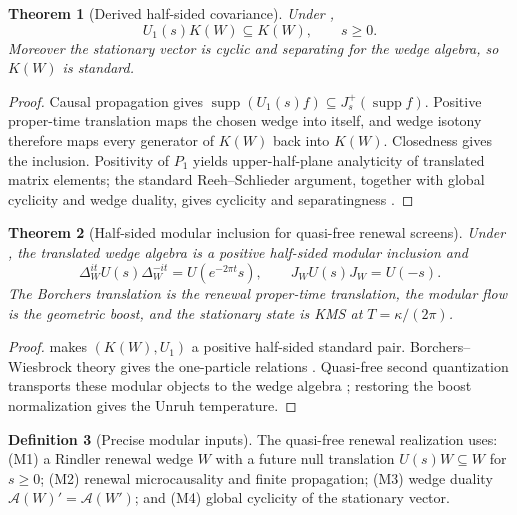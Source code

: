 \documentclass[11pt]{article}
\newtheorem{theorem}{Theorem}[section]
\theoremstyle{definition}
\newtheorem{definition}[theorem]{Definition}
\theoremstyle{remark}
\newcommand{\A}{\mathcal A}
\DeclareMathOperator{\supp}{supp}
\begin{document}
\begin{theorem}[Derived half-sided covariance]
\label{thm:derived-half-sided}
Under ,
\[
 U_1(s)K(W)\subseteq K(W),\qquad s\ge0.
\]
Moreover the stationary vector is cyclic and separating for the wedge algebra,
so $K(W)$ is standard.
\end{theorem}

\begin{proof}
Causal propagation gives
$\supp(U_1(s)f)\subseteq J_s^+(\supp f)$.  Positive proper-time translation
maps the chosen wedge into itself, and wedge isotony therefore maps every
generator of $K(W)$ back into $K(W)$.  Closedness gives the inclusion.  Positivity
of $P_1$ yields upper-half-plane analyticity of translated matrix elements; the
standard Reeh--Schlieder argument, together with global cyclicity and wedge
duality, gives cyclicity and separatingness \cite{ReehSchlieder,StreaterWightman,BGL2}.
\end{proof}

\begin{theorem}[Half-sided modular inclusion for quasi-free renewal screens]
\label{thm:quasifree-modular}
Under , the translated wedge algebra is a positive
half-sided modular inclusion and
\[
 \Delta_W^{it}U(s)\Delta_W^{-it}=U(e^{-2\pi t}s),
 \qquad J_WU(s)J_W=U(-s).
\]
The Borchers translation is the renewal proper-time translation, the modular
flow is the geometric boost, and the stationary state is KMS at
$T=\kappa/(2\pi)$.
\end{theorem}

\begin{proof}
 makes $(K(W),U_1)$ a positive half-sided standard
pair.  Borchers--Wiesbrock theory gives the one-particle relations
\cite{Borchers,Wiesbrock,Longo,BGL}.  Quasi-free second quantization transports
these modular objects to the wedge algebra
\cite{EckmannOsterwalder,FiglioliniGuido}; restoring the boost normalization
gives the Unruh temperature.
\end{proof}


\begin{definition}[Precise modular inputs]
\label{def:precise-modular-inputs}
The quasi-free renewal realization uses: \textup{(M1)} a Rindler renewal wedge
$W$ with a future null translation $U(s)W\subseteq W$ for $s\ge0$;
\textup{(M2)} renewal microcausality and finite propagation;
\textup{(M3)} wedge duality $\A(W)'=\A(W')$; and
\textup{(M4)} global cyclicity of the stationary vector.
\end{definition}
\end{document}
